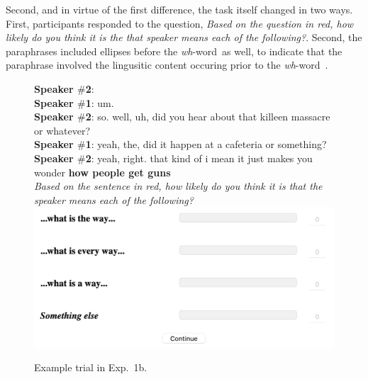 \documentclass[12pt,letterpaper,table,svgnames,dvipsnames]{article}
\newcommand{\whw}{\emph{wh}-word~}
\begin{document}
Second, and in virtue of the first difference, the task itself changed in two ways. First, participants responded to the question, \emph{Based on the question in red, how likely do you think it is the that speaker means each of the following?}. Second, the paraphrases included ellipses before the \whw as well, to indicate that the paraphrase involved the lingusitic content occuring prior to the \whw.

\begin{figure}%
\begin{tcolorbox}[colback=white]

\textbf{Speaker $\#$2}: \\
\textbf{Speaker $\#$1}: um.\\
\textbf{Speaker $\#$2}: so. well, uh, did you hear about that killeen massacre or whatever?\\
\textbf{Speaker $\#$1}: yeah, the, did it happen at a cafeteria or something?\\
\textbf{Speaker $\#$2}: yeah, right. that kind of i mean it just makes \color{red}you wonder \textbf{how people get guns}\color{black}\\

\noindent \emph{Based on the sentence in red, how likely do you think it is that the speaker means each of the following?}\\

\includegraphics[scale=.5]{figures/sliders_eq.png}
\end{tcolorbox}
\caption{Example trial in Exp.~1b.}
\label{trial-ex1b}
\end{figure}
\end{document}

